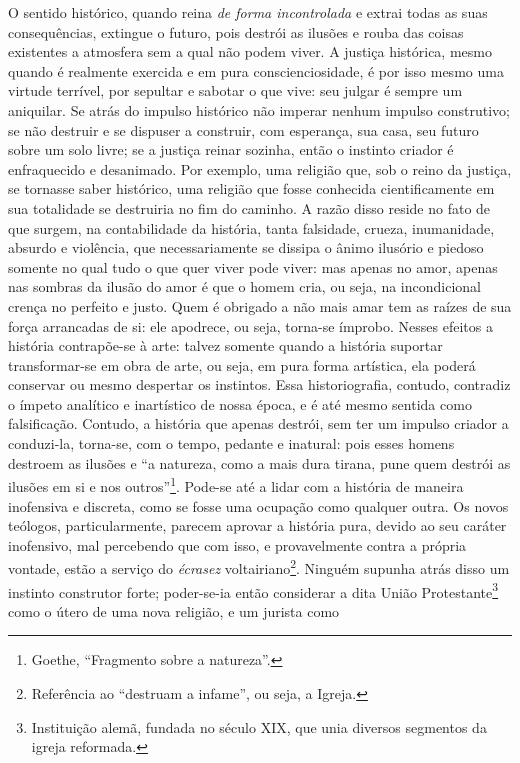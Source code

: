 O sentido histórico, quando reina \emph{de forma incontrolada} e extrai
todas as suas consequências, extingue o futuro, pois destrói as ilusões
e rouba das coisas existentes a atmosfera sem a qual não podem viver. A
justiça histórica, mesmo quando é realmente exercida e em pura
conscienciosidade, é por isso mesmo uma virtude terrível, por sepultar e
sabotar o que vive: seu julgar é sempre um aniquilar. Se atrás do
impulso histórico não imperar nenhum impulso construtivo; se não
destruir e se dispuser a construir, com esperança, sua casa, seu futuro
sobre um solo livre; se a justiça reinar sozinha, então o instinto
criador é enfraquecido e desanimado. Por exemplo, uma religião que, sob
o reino da justiça, se tornasse saber histórico, uma religião que fosse
conhecida cientificamente em sua totalidade se destruiria no fim do
caminho. A razão disso reside no fato de que surgem, na contabilidade da
história, tanta falsidade, crueza, inumanidade, absurdo e violência, que
necessariamente se dissipa o ânimo ilusório e piedoso somente no qual
tudo o que quer viver pode viver: mas apenas no amor, apenas nas sombras
da ilusão do amor é que o homem cria, ou seja, na incondicional crença
no perfeito e justo. Quem é obrigado a não mais amar tem as raízes de
sua força arrancadas de si: ele apodrece, ou seja, torna-se ímprobo.
Nesses efeitos a história contrapõe-se à arte: talvez somente quando a
história suportar transformar-se em obra de arte, ou seja, em pura forma
artística, ela poderá conservar ou mesmo despertar os instintos. Essa
historiografia, contudo, contradiz o ímpeto analítico e inartístico de
nossa época, e é até mesmo sentida como falsificação. Contudo, a
história que apenas destrói, sem ter um impulso criador a conduzi-la,
torna-se, com o tempo, pedante e inatural: pois esses homens destroem as
ilusões e ``a natureza, como a mais dura tirana, pune quem destrói as
ilusões em si e nos outros''\footnote{Goethe, ``Fragmento sobre a
  natureza''.}. Pode-se até a lidar com a história de maneira inofensiva
e discreta, como se fosse uma ocupação como qualquer outra. Os novos
teólogos, particularmente, parecem aprovar a história pura, devido ao
seu caráter inofensivo, mal percebendo que com isso, e provavelmente
contra a própria vontade, estão a serviço do \emph{écrasez}
voltairiano\footnote{Referência ao ``destruam a infame'', ou seja, a
  Igreja.}. Ninguém supunha atrás disso um instinto construtor forte;
poder-se-ia então considerar a dita União Protestante\footnote{Instituição
  alemã, fundada no século XIX, que unia diversos segmentos da igreja
  reformada.} como o útero de uma nova religião, e um jurista como
